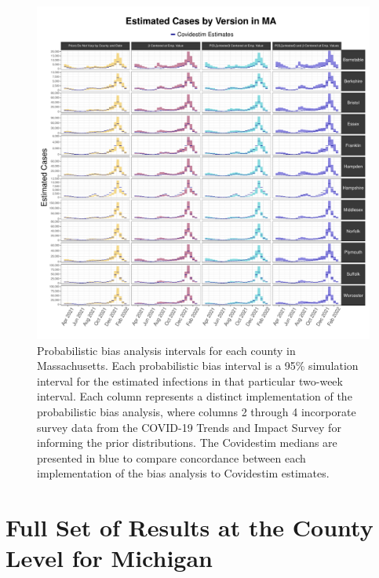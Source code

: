 \documentclass[12pt,twoside]{smiththesis}
\begin{document}
\begin{figure}

{\centering \includegraphics[width=1\linewidth]{figure/ma_pb_compared_to_covidestim} 

}

\caption{\label{fig:ma-comp-covidestim}Probabilistic bias analysis intervals for each county in Massachusetts. Each probabilistic bias interval is a 95\% simulation interval for the estimated infections in that particular two-week interval. Each column represents a distinct implementation of the probabilistic bias analysis, where columns 2 through 4 incorporate survey data from the COVID-19 Trends and Impact Survey for informing the prior distributions. The Covidestim medians are presented in blue to compare concordance between each implementation of the bias analysis to Covidestim estimates.}\label{fig:unnamed-chunk-117}
\end{figure}
\hypertarget{full-set-of-results-at-the-county-level-for-michigan}{%
\section{Full Set of Results at the County Level for Michigan}\label{full-set-of-results-at-the-county-level-for-michigan}}
\end{document}
